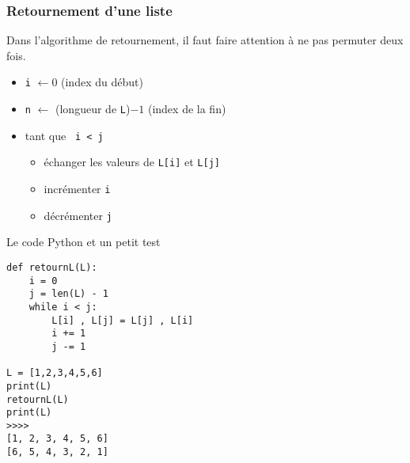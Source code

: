 \subsubsection{Retournement d'une liste}
Dans l'algorithme de retournement, il faut faire attention à ne pas permuter deux fois.
\begin{itemize}
  \item \verb|i| $\longleftarrow 0$ (index du début)
  \item \verb|n| $\longleftarrow$ (longueur de \verb|L|)$-1$ (index de la fin)
  \item tant que \verb| i < j|
  \begin{itemize}
    \item échanger les valeurs de \verb|L[i]| et \verb|L[j]|
    \item incrémenter \verb|i|
    \item décrémenter \verb|j|
  \end{itemize}
\end{itemize}
Le code Python et un petit test
\begin{verbatim}
def retournL(L):
    i = 0
    j = len(L) - 1
    while i < j:
        L[i] , L[j] = L[j] , L[i]
        i += 1
        j -= 1

L = [1,2,3,4,5,6]
print(L)
retournL(L)
print(L)
>>>>
[1, 2, 3, 4, 5, 6]
[6, 5, 4, 3, 2, 1]
\end{verbatim}

